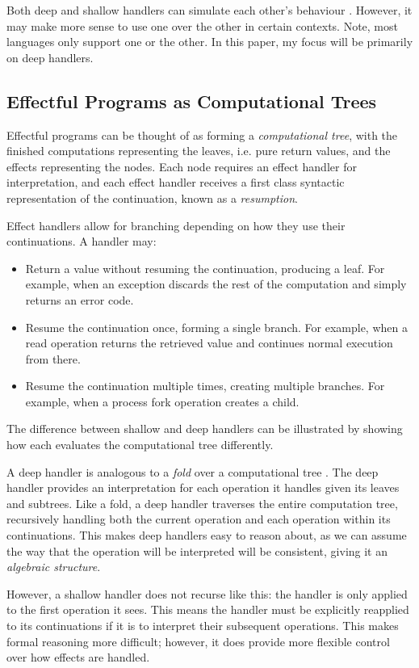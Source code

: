 \documentclass[logo,bsc,singlespacing,parskip]{infthesis}
\begin{document}
Both deep and shallow handlers can simulate each other's behaviour \cite{hillerstrom2018shallow}. However, it may make more sense to use one over the other in certain contexts. Note, most languages only support one or the other. In this paper, my focus will be primarily on deep handlers.

\subsection{Effectful Programs as Computational Trees}
Effectful programs can be thought of as forming a \textit{computational tree}, with the finished computations representing the leaves, i.e. pure return values, and the effects representing the nodes. Each node requires an effect handler for interpretation, and each effect handler receives a first class syntactic representation of the continuation, known as a \textit{resumption}. 

Effect handlers allow for branching depending on how they use their continuations. A handler may: 
\begin{itemize}
    \item Return a value without resuming the continuation, producing a leaf. For example, when an exception discards the rest of the computation and simply returns an error code.
    \item Resume the continuation once, forming a single branch. For example, when a read operation returns the retrieved value and continues normal execution from there. 
    \item Resume the continuation multiple times, creating multiple branches. For example, when a process fork operation creates a child.
\end{itemize}


The difference between shallow and deep handlers can be illustrated by showing how each evaluates the computational tree differently.

A deep handler is analogous to a \textit{fold} over a computational tree \cite{hillerstrom_foundations_nodate}. The deep handler provides an interpretation for each operation it handles given its leaves and subtrees. Like a fold, a deep handler traverses the entire computation tree, recursively handling both the current operation and each operation within its continuations. This makes deep handlers easy to reason about, as we can assume the way that the operation will be interpreted will be consistent, giving it an \textit{algebraic structure}.

However, a shallow handler does not recurse like this: the handler is only applied to the first operation it sees. This means the handler must be explicitly reapplied to its continuations if it is to interpret their subsequent operations. This makes formal reasoning more difficult; however,  it does provide more flexible control over how effects are handled.
\end{document}

